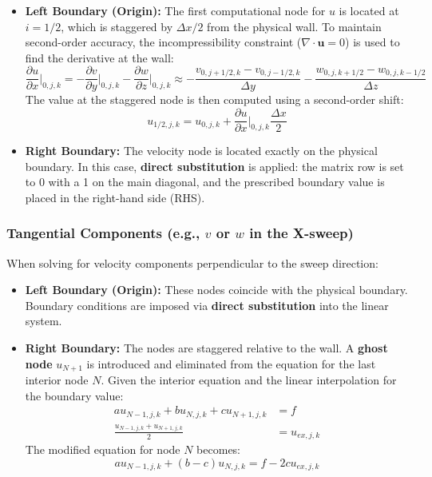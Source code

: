 \documentclass[12pt]{article}
\begin{document}
\begin{itemize}
    \item \textbf{Left Boundary (Origin):} The first computational node for $u$ is located at $i=1/2$, which is staggered by $\Delta x/2$ from the physical wall. To maintain second-order accuracy, the incompressibility constraint ($\nabla \cdot \mathbf{u} = 0$) is used to find the derivative at the wall:
    \begin{equation}
        \frac{\partial u}{\partial x}\Big|_{0,j,k} = -\frac{\partial v}{\partial y}\Big|_{0,j,k} - \frac{\partial w}{\partial z}\Big|_{0,j,k} \approx -\frac{v_{0,j+1/2,k} - v_{0,j-1/2,k}}{\Delta y} - \frac{w_{0,j,k+1/2} - w_{0,j,k-1/2}}{\Delta z}
    \end{equation}
    The value at the staggered node is then computed using a second-order shift:
    \begin{equation}
        u_{1/2,j,k} = u_{0,j,k} + \frac{\partial u}{\partial x}\Big|_{0,j,k} \frac{\Delta x}{2}
    \end{equation}
    
    \item \textbf{Right Boundary:} The velocity node is located exactly on the physical boundary. In this case, \textbf{direct substitution} is applied: the matrix row is set to 0 with a 1 on the main diagonal, and the prescribed boundary value is placed in the right-hand side (RHS).
\end{itemize}

\subsubsection{Tangential Components (e.g., $v$ or $w$ in the X-sweep)}
When solving for velocity components perpendicular to the sweep direction:

\begin{itemize}
    \item \textbf{Left Boundary (Origin):} These nodes coincide with the physical boundary. Boundary conditions are imposed via \textbf{direct substitution} into the linear system.
    
    \item \textbf{Right Boundary:} The nodes are staggered relative to the wall. A \textbf{ghost node} $u_{N+1}$ is introduced and eliminated from the equation for the last interior node $N$. Given the interior equation and the linear interpolation for the boundary value:
    \begin{align}
        au_{N-1,j,k} + bu_{N,j,k} + cu_{N+1,j,k} &= f \\
        \frac{u_{N-1,j,k} + u_{N+1,j,k}}{2} &= u_{ex,j,k}
    \end{align}
    The modified equation for node $N$ becomes:
    \begin{equation}
        au_{N-1,j,k} + (b - c)u_{N,j,k} = f - 2cu_{ex,j,k}
    \end{equation}
\end{itemize}
\end{document}
